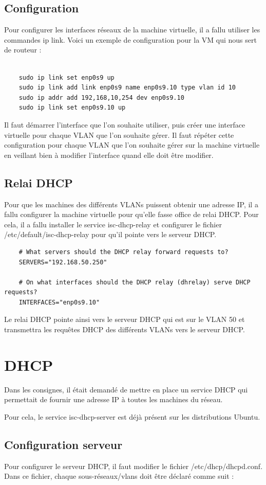 \documentclass[a4paper,12pt,openany]{report}
\begin{document}
        \subsection{Configuration}
        Pour configurer les interfaces réseaux de la machine virtuelle, il a fallu utiliser les commandes ip link. Voici un exemple de configuration pour la VM qui nous sert de routeur :
        \begin{verbatim}

    sudo ip link set enp0s9 up
    sudo ip link add link enp0s9 name enp0s9.10 type vlan id 10 
    sudo ip addr add 192,168,10,254 dev enp0s9.10 
    sudo ip link set enp0s9.10 up
        \end{verbatim}
        Il faut démarrer l'interface que l'on souhaite utiliser, puis créer une interface virtuelle pour chaque VLAN que l'on souhaite gérer. Il faut répéter cette configuration pour chaque VLAN que l'on souhaite gérer sur la machine virtuelle en veillant bien à modifier l'interface quand elle doit être modifier. 
        \subsection{Relai DHCP}
        Pour que les machines des différents VLANs puissent obtenir une adresse IP, il a fallu configurer la machine virtuelle pour qu'elle fasse office de relai DHCP. Pour cela, il a fallu installer le service isc-dhcp-relay et configurer le fichier /etc/default/isc-dhcp-relay pour qu'il pointe vers le serveur DHCP.
        \begin{verbatim}
    # What servers should the DHCP relay forward requests to?
    SERVERS="192.168.50.250"

    # On what interfaces should the DHCP relay (dhrelay) serve DHCP requests?
    INTERFACES="enp0s9.10"
        \end{verbatim}
        Le relai DHCP pointe ainsi vers le serveur DHCP qui est sur le VLAN 50 et transmettra les requêtes DHCP des différents VLANs vers le serveur DHCP.
        \section{DHCP}
            Dans les consignes, il était demandé de mettre en place un service DHCP qui permettait de fournir une adresse IP à toutes les machines du réseau. 
            
            Pour cela, le service isc-dhcp-server est déjà présent sur les distributions Ubuntu.
            \subsection{Configuration serveur}
            Pour configurer le serveur DHCP, il faut modifier le fichier /etc/dhcp/dhcpd.conf. 
            Dans ce fichier, chaque sous-réseaux/vlans doit être déclaré comme suit :
                
\end{document}
